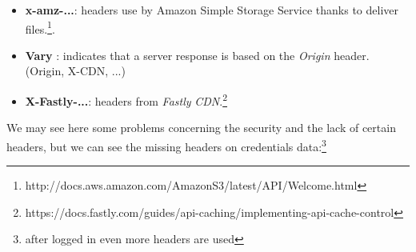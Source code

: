 \documentclass[conference]{IEEEtran}
\begin{document}
\begin{itemize}
    \textit{DRDB} stands for \textit{Distributed Replicated Block Device} and is used to link and synchronize by replication some devices as nodes of the network. \footnote{see fig 10} Furthermore, thanks to \textit{heartbeat}\footnote{http://linux-ha.org/wiki/Heartbeat}, when a server experience errors the second server take automatically its role.
    
    "Tom, ... Please don't paste inline this time, ..."\footnote{https://lists.gt.net/linuxha/pacemaker/75542} \footnote{https://cwe.mitre.org/data/definitions/200.html}
    
    \item \textbf{x-amz-...}: headers use by Amazon Simple Storage Service thanks to deliver files.\footnote{http://docs.aws.amazon.com/AmazonS3/latest/API/Welcome.html}. 

    \item \textbf{Vary} : indicates that a server response is based on the \textit{Origin} header. (Origin, X-CDN, ...) 
    
    \item \textbf{X-Fastly-...}: headers from \textit{Fastly} \textit{CDN}.\footnote{https://docs.fastly.com/guides/api-caching/implementing-api-cache-control}  

\end{itemize}

We may see here some problems concerning the security and the lack of certain headers, but we can see the missing headers on credentials data:\footnote{after logged in even more headers are used} 
\end{document}
